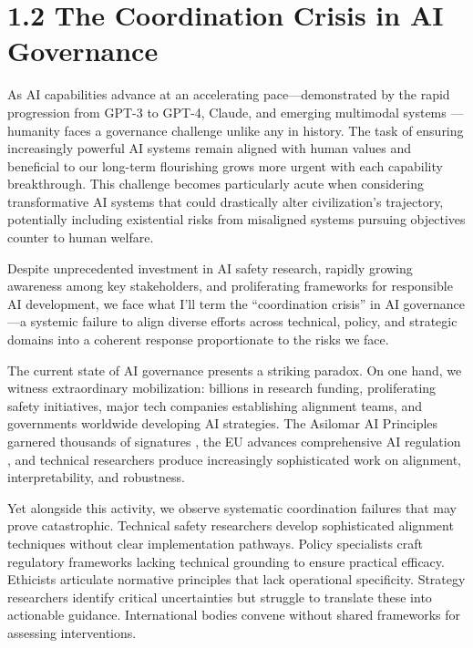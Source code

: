 \documentclass[
  11pt,
  letterpaper,
]{book}
\begin{document}
\section{1.2 The Coordination Crisis in AI
Governance}\label{the-coordination-crisis-in-ai-governance}

As AI capabilities advance at an accelerating pace---demonstrated by the
rapid progression from GPT-3 to GPT-4, Claude, and emerging multimodal
systems \textcite{maslej2025} \textcite{samborska2025}---humanity faces
a governance challenge unlike any in history. The task of ensuring
increasingly powerful AI systems remain aligned with human values and
beneficial to our long-term flourishing grows more urgent with each
capability breakthrough. This challenge becomes particularly acute when
considering transformative AI systems that could drastically alter
civilization's trajectory, potentially including existential risks from
misaligned systems pursuing objectives counter to human welfare.

Despite unprecedented investment in AI safety research, rapidly growing
awareness among key stakeholders, and proliferating frameworks for
responsible AI development, we face what I'll term the ``coordination
crisis'' in AI governance---a systemic failure to align diverse efforts
across technical, policy, and strategic domains into a coherent response
proportionate to the risks we face.

The current state of AI governance presents a striking paradox. On one
hand, we witness extraordinary mobilization: billions in research
funding, proliferating safety initiatives, major tech companies
establishing alignment teams, and governments worldwide developing AI
strategies. The Asilomar AI Principles garnered thousands of signatures
\textcite{tegmark2024}, the EU advances comprehensive AI regulation
\textcite{european2024}, and technical researchers produce increasingly
sophisticated work on alignment, interpretability, and robustness.

Yet alongside this activity, we observe systematic coordination failures
that may prove catastrophic. Technical safety researchers develop
sophisticated alignment techniques without clear implementation
pathways. Policy specialists craft regulatory frameworks lacking
technical grounding to ensure practical efficacy. Ethicists articulate
normative principles that lack operational specificity. Strategy
researchers identify critical uncertainties but struggle to translate
these into actionable guidance. International bodies convene without
shared frameworks for assessing interventions.
\end{document}
